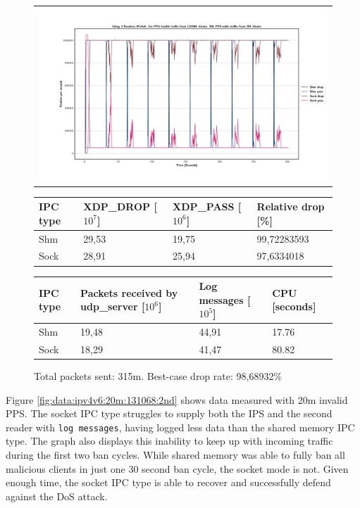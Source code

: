\begin{figure}[!h]
	\centering
	\scriptsize
	\begin{tabular}{c}
    	\centerline{\includegraphics[width=1.2\textwidth]{images/IPv4v6_1m_2ndReader_1.png}}
	\end{tabular}
	\begin{tabular}{llll}
		\toprule
		\textbf{IPC type} & \textbf{XDP\_DROP [$10^7$]} & \textbf{XDP\_PASS [$10^6$]} & \textbf{Relative drop [\%]} \\ \midrule 
		Shm & 29,53 & 19,75 & 99,72283593 \\
        Sock & 28,91 & 25,94 & 97,6334018 \\
	\bottomrule
	\end{tabular}
    \begin{tabular}{llll}
		\toprule
		\textbf{IPC type} & \textbf{Packets received by udp\_server [$10^6$]} & \textbf{Log messages [$10^5$]} & \textbf{CPU [seconds]} \\ \midrule 
		Shm & 19,48 & 44,91 & 17.76 \\
        Sock & 18,29 & 41,47 & 80.82 \\
	\bottomrule
	\end{tabular}
	\caption[Simplefail2ban with 2nd Reader, IPv4v6, 1m \ac{PPS}, 131068 malicious clients]{Total packets sent: 315m. Best-case drop rate: 98,68932\%}
	\label{fig:data:ipv4v6:1m:131068:2nd}
\end{figure}

Figure \ref{fig:data:ipv4v6:20m:131068:2nd} shows data measured with 20m invalid \ac{PPS}.
The socket \ac{IPC} type struggles to supply both the \ac{IPS} and the second reader with \texttt{log messages}, having logged less data than the shared memory \ac{IPC} type.
The graph also displays this inability to keep up with incoming traffic during the first two ban cycles.
While shared memory was able to fully ban all malicious clients in just one 30 second ban cycle, the socket mode is not.
Given enough time, the socket \ac{IPC} type is able to recover and successfully defend against the \ac{DoS} attack.

